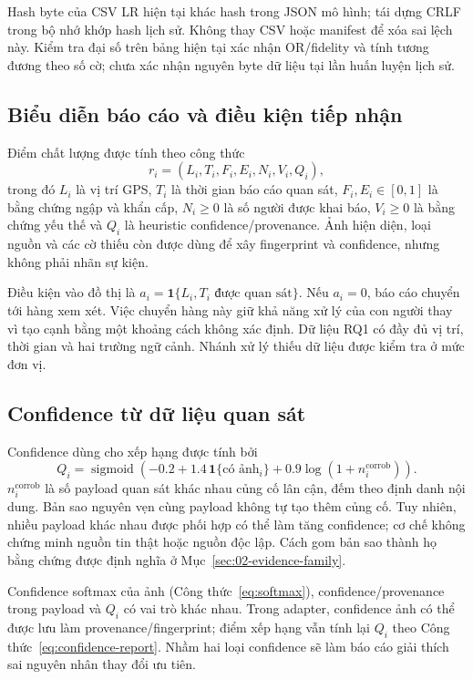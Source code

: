 Hash byte của CSV LR hiện tại khác hash trong JSON mô hình; tái dựng CRLF trong bộ nhớ khớp hash lịch sử. Không thay CSV hoặc manifest để xóa sai lệch này. Kiểm tra đại số trên bảng hiện tại xác nhận OR/fidelity và tính tương đương theo số cờ; chưa xác nhận nguyên byte dữ liệu tại lần huấn luyện lịch sử.

\subsection{Biểu diễn báo cáo và điều kiện tiếp nhận}
Điểm chất lượng được tính theo công thức
\begin{equation}
 r_i=(L_i,T_i,F_i,E_i,N_i,V_i,Q_i),
 \label{eq:report-tuple}
\end{equation}
trong đó $L_i$ là vị trí GPS, $T_i$ là thời gian báo cáo quan sát, $F_i,E_i\in[0,1]$ là bằng chứng ngập và khẩn cấp, $N_i\geq0$ là số người được khai báo, $V_i\geq0$ là bằng chứng yếu thế và $Q_i$ là heuristic confidence/provenance. Ảnh hiện diện, loại nguồn và các cờ thiếu còn được dùng để xây fingerprint và confidence, nhưng không phải nhãn sự kiện.

Điều kiện vào đồ thị là $a_i=\mathbf{1}\{L_i,T_i\text{ được quan sát}\}$. Nếu $a_i=0$, báo cáo chuyển tới hàng xem xét. Việc chuyển hàng này giữ khả năng xử lý của con người thay vì tạo cạnh bằng một khoảng cách không xác định. Dữ liệu RQ1 có đầy đủ vị trí, thời gian và hai trường ngữ cảnh. Nhánh xử lý thiếu dữ liệu được kiểm tra ở mức đơn vị.

\subsection{Confidence từ dữ liệu quan sát}
Confidence dùng cho xếp hạng được tính bởi
\begin{equation}
 Q_i=\operatorname{sigmoid}\!\left(-0.2+1.4\,\mathbf{1}\{\text{có ảnh}_i\}
               +0.9\log(1+n_i^{\mathrm{corrob}})\right).
 \label{eq:confidence-report}
\end{equation}
$n_i^{\mathrm{corrob}}$ là số payload quan sát khác nhau củng cố lân cận, đếm theo định danh nội dung. Bản sao nguyên vẹn cùng payload không tự tạo thêm củng cố. Tuy nhiên, nhiều payload khác nhau được phối hợp có thể làm tăng confidence; cơ chế không chứng minh nguồn tin thật hoặc nguồn độc lập. Cách gom bản sao thành họ bằng chứng được định nghĩa ở Mục~\ref{sec:02-evidence-family}.

Confidence softmax của ảnh (Công thức~\ref{eq:softmax}), confidence/provenance trong payload và $Q_i$ có vai trò khác nhau. Trong adapter, confidence ảnh có thể được lưu làm provenance/fingerprint; điểm xếp hạng vẫn tính lại $Q_i$ theo Công thức~\ref{eq:confidence-report}. Nhầm hai loại confidence sẽ làm báo cáo giải thích sai nguyên nhân thay đổi ưu tiên.

